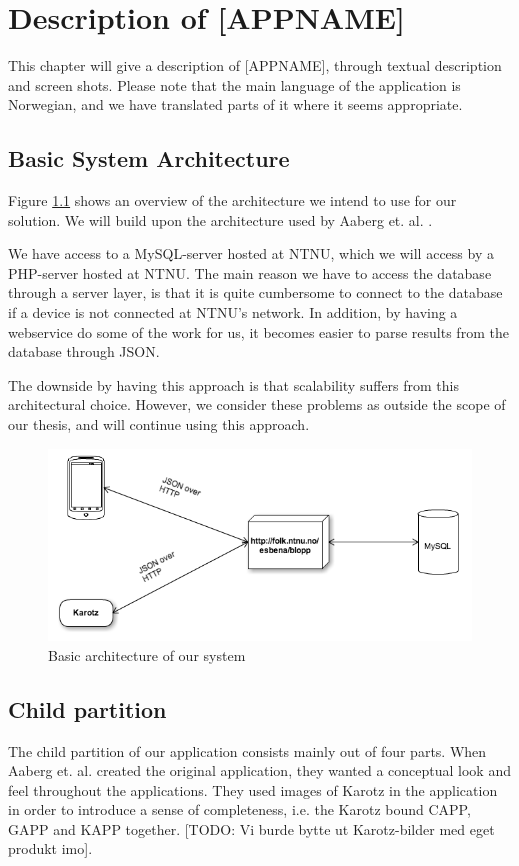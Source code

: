 \chapter{Description of [APPNAME]}
\label{chp:description}

This chapter will give a description of [APPNAME], through textual description and screen shots. Please note that the main language of the application is Norwegian, and we have translated parts of it where it seems appropriate. 

\section{Basic System Architecture}
\label{sec:architecture}
Figure \ref{fig:basic-architecture} shows an overview of the architecture we intend to use for our solution. We will build upon the architecture used by Aaberg et. al. \cite{CustomerDriven}.

We have access to a MySQL-server hosted at NTNU, which we will access by a PHP-server hosted at NTNU. The main reason we have to access the database through a server layer, is that it is quite cumbersome to connect to the database if a device is not connected at NTNU's network. In addition, by having a webservice do some of the work for us, it becomes easier to parse results from the database through JSON.   


The downside by having this approach is that scalability suffers from this architectural choice. However, we consider these problems as outside the scope of our thesis, and will continue using this approach.

\begin{figure}
		\centering
			\includegraphics[width=0.50\paperwidth]{Pictures/basic-architecture.png}
		\caption{Basic architecture of our system}
		\label{fig:basic-architecture}
\end{figure}

\section{Child partition}
\label{sec:description-child-partition}
The child partition of our application consists mainly out of four parts. When Aaberg et. al. created the original application, they wanted a conceptual look and feel throughout the applications. They used images of Karotz in the application in order to introduce a sense of completeness, i.e. the Karotz bound CAPP, GAPP and KAPP together. [TODO: Vi burde bytte ut Karotz-bilder med eget produkt imo]. 

